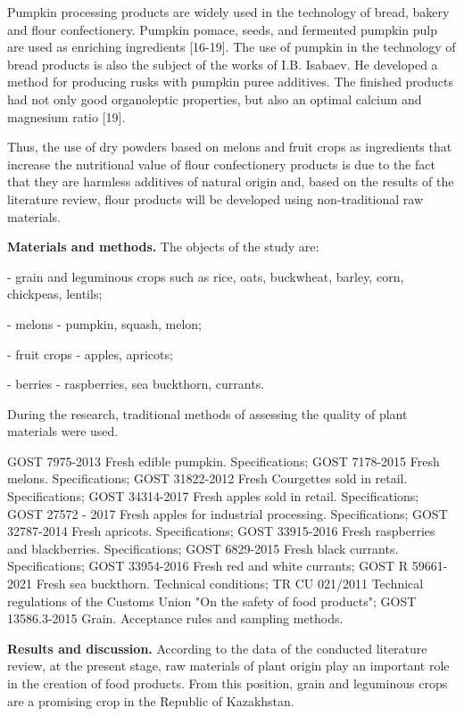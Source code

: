 Pumpkin processing products are widely used in the technology of bread,
bakery and flour confectionery. Pumpkin pomace, seeds, and fermented
pumpkin pulp are used as enriching ingredients {[}16-19{]}. The use of
pumpkin in the technology of bread products is also the subject of the
works of I.B. Isabaev. He developed a method for producing rusks with
pumpkin puree additives. The finished products had not only good
organoleptic properties, but also an optimal calcium and magnesium ratio
{[}19{]}.

Thus, the use of dry powders based on melons and fruit crops as
ingredients that increase the nutritional value of flour confectionery
products is due to the fact that they are harmless additives of natural
origin and, based on the results of the literature review, flour
products will be developed using non-traditional raw materials.

{\bfseries Materials and methods.} The objects of the study are:

- grain and leguminous crops such as rice, oats, buckwheat, barley,
corn, chickpeas, lentils;

- melons - pumpkin, squash, melon;

- fruit crops - apples, apricots;

- berries - raspberries, sea buckthorn, currants.

During the research, traditional methods of assessing the quality of
plant materials were used.

GOST 7975-2013 Fresh edible pumpkin. Specifications; GOST 7178-2015
Fresh melons. Specifications; GOST 31822-2012 Fresh Courgettes sold in
retail. Specifications; GOST 34314-2017 Fresh apples sold in retail.
Specifications; GOST 27572 - 2017 Fresh apples for industrial
processing. Specifications; GOST 32787-2014 Fresh apricots.
Specifications; GOST 33915-2016 Fresh raspberries and blackberries.
Specifications; GOST 6829-2015 Fresh black currants. Specifications;
GOST 33954-2016 Fresh red and white currants; GOST R 59661-2021 Fresh
sea buckthorn. Technical conditions; TR CU 021/2011 Technical
regulations of the Customs Union "On the safety of food products"; GOST
13586.3-2015 Grain. Acceptance rules and sampling methods.

{\bfseries Results and discussion.} According to the data of the conducted
literature review, at the present stage, raw materials of plant origin
play an important role in the creation of food products. From this
position, grain and leguminous crops are a promising crop in the
Republic of Kazakhstan.

